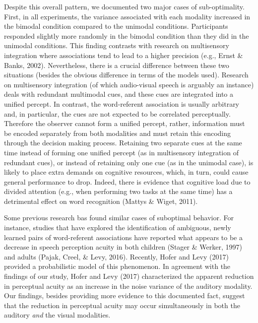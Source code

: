\documentclass[english,floatsintext,man]{apa6}
\theoremstyle{definition}
\theoremstyle{definition}
\theoremstyle{definition}
\theoremstyle{remark}
\begin{document}
Despite this overall pattern, we documented two major cases of
sub-optimality. First, in all experiments, the variance associated with
each modality increased in the bimodal condition compared to the
unimodal conditions. Participants responded slightly more randomly in
the bimodal condition than they did in the unimodal conditions. This
finding contrasts with research on multisensory integration where
associations tend to lead to a higher precision (e.g., Ernst \& Banks,
2002). Nevertheless, there is a crucial difference between these two
situations (besides the obvious difference in terms of the models used).
Research on multisensory integration (of which audio-visual speech is
arguably an instance) deals with redundant multimodal cues, and these
cues are integrated into a unified percept. In contrast, the
word-referent association is usually arbitrary and, in particular, the
cues are not expected to be correlated perceptually. Therefore the
observer cannot form a unified percept, rather, information must be
encoded separately from both modalities and must retain this encoding
through the decision making process. Retaining two separate cues at the
same time instead of forming one unified percept (as in multisensory
integration of redundant cues), or instead of retaining only one cue (as
in the unimodal case), is likely to place extra demands on cognitive
resources, which, in turn, could cause general performance to drop.
Indeed, there is evidence that cognitive load due to divided attention
(e.g., when performing two tasks at the same time) has a detrimental
effect on word recognition (Mattys \& Wiget, 2011).

Some previous research bas found similar cases of suboptimal behavior.
For instance, studies that have explored the identification of
ambiguous, newly learned pairs of word-referent associations have
reported what appears to be a decrease in speech perception acuity in
both children (Stager \& Werker, 1997) and adults (Pajak, Creel, \&
Levy, 2016). Recently, Hofer and Levy (2017) provided a probabilistic
model of this phenomenon. In agreement with the findings of our study,
Hofer and Levy (2017) characterized the apparent reduction in perceptual
acuity as an increase in the noise variance of the auditory modality.
Our findings, besides providing more evidence to this documented fact,
suggest that the reduction in perceptual acuity may occur simultaneously
in both the auditory \emph{and} the visual modalities.
\end{document}
